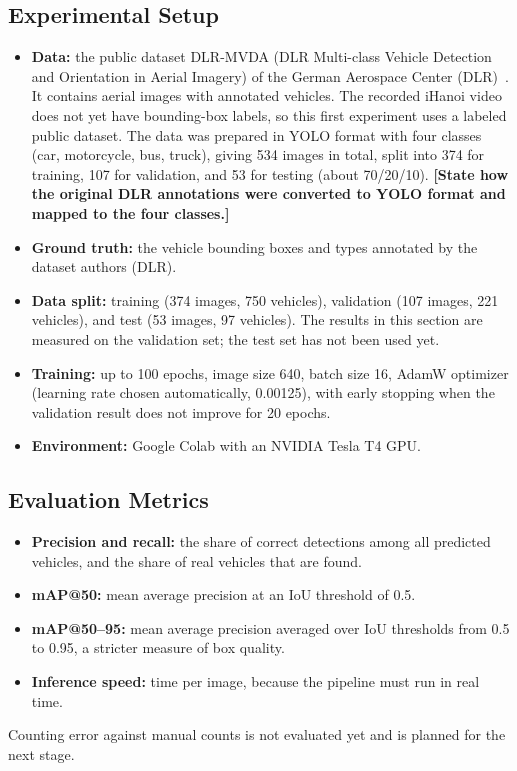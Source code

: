\documentclass[12pt,a4paper]{article}
\newcommand{\todo}[1]{\textcolor{red!70!black}{\textbf{[#1]}}}
\begin{document}
\subsection{Experimental Setup}
\label{subsec:ml-setup}
\begin{itemize}
  \item \textbf{Data:} the public dataset DLR-MVDA (DLR Multi-class Vehicle
        Detection and Orientation in Aerial Imagery) of the German Aerospace
        Center (DLR)~\cite{dlr-mvda}.
        It contains aerial images with annotated vehicles. The recorded iHanoi
        video does not yet have bounding-box labels, so this first experiment
        uses a labeled public dataset. The data was prepared in YOLO format
        with four classes (car, motorcycle, bus, truck), giving 534 images
        in total, split into 374 for training, 107 for validation, and 53 for
        testing (about 70/20/10). \todo{State how the original DLR annotations
        were converted to YOLO format and mapped to the four classes.}
  \item \textbf{Ground truth:} the vehicle bounding boxes and types annotated by
        the dataset authors (DLR).
  \item \textbf{Data split:} training (374 images, 750 vehicles), validation
        (107 images, 221 vehicles), and test (53 images, 97 vehicles). The
        results in this section are measured on the validation set; the test
        set has not been used yet.
  \item \textbf{Training:} up to 100 epochs, image size 640, batch size 16,
        AdamW optimizer (learning rate chosen automatically, 0.00125), with
        early stopping when the validation result does not improve for 20
        epochs.
  \item \textbf{Environment:} Google Colab with an NVIDIA Tesla T4 GPU.
\end{itemize}

\subsection{Evaluation Metrics}
\label{subsec:ml-metrics}
\begin{itemize}
  \item \textbf{Precision and recall:} the share of correct detections among
        all predicted vehicles, and the share of real vehicles that are found.
  \item \textbf{mAP@50:} mean average precision at an IoU threshold of 0.5.
  \item \textbf{mAP@50--95:} mean average precision averaged over IoU
        thresholds from 0.5 to 0.95, a stricter measure of box quality.
  \item \textbf{Inference speed:} time per image, because the pipeline must run
        in real time.
\end{itemize}
Counting error against manual counts is not evaluated yet and is planned for
the next stage.
\end{document}
